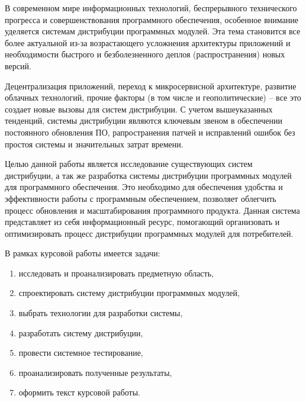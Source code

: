 \Introduction

В современном мире информационных технологий, беспрерывного технического прогресса и совершенствования программного обеспечения, особенное внимание уделяется системам дистрибуции программных модулей. Эта тема становится все более актуальной из-за возрастающего усложнения архитектуры приложений и необходимости быстрого и безболезненного деплоя (распространения) новых версий.

Децентрализация приложений, переход к микросервисной архитектуре, развитие облачных технологий, прочие факторы (в том числе и геополитические) – все это создает новые вызовы для систем дистрибуции. С учетом вышеуказанных тенденций, системы дистрибуции являются ключевым звеном в обеспечении постоянного обновления ПО, рапространения патчей и исправлений ошибок без простоя системы и значительных затрат времени. 

Целью данной работы является исследование существующих систем дистрибуции, а так же разработка системы дистрибуции программных модулей для программного обеспечения. Это необходимо для обеспечения удобства и эффективности работы с программным обеспечением, позволяет облегчить процесс обновления и масштабирования программного продукта. Данная система представляет из себя информационный ресурс, помогающий организовать и оптимизировать процесс дистрибуции программных модулей для потребителей.

В рамках курсовой работы имеется задачи:

\renewcommand{\labelenumi}{\arabic{enumi})}
\renewcommand{\labelenumii}{\asbuk{enumii})}

\begin{enumerate}
\item исследовать и проанализировать предметную область,
\item спроектировать систему дистрибуции программных модулей,
\item выбрать технологии для разработки системы,
\item разработать систему дистрибуции,
\item провести системное тестирование,
\item проанализировать полученные результаты,
\item оформить текст курсовой работы.
\end{enumerate}

